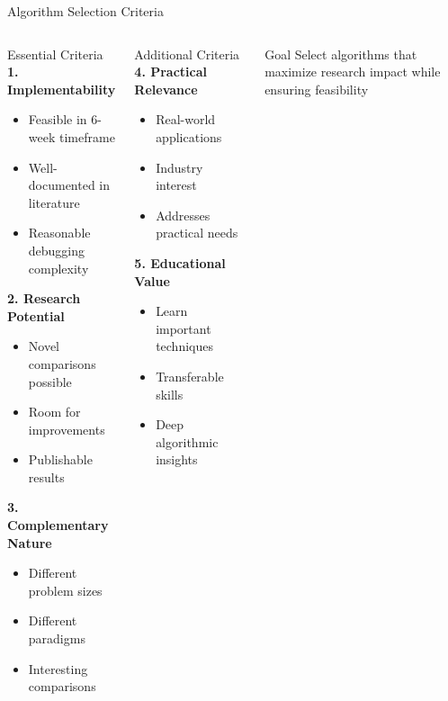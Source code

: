 \documentclass[aspectratio=169]{beamer}
\renewcommand{\footnotesize}{\tiny}
\begin{document}
\begin{frame}{Algorithm Selection Criteria}
	\begin{columns}[T]
		\begin{block}{Essential Criteria}
			\footnotesize
			\textbf{1. Implementability}
			\begin{itemize}
				\item Feasible in 6-week timeframe
				\item Well-documented in literature
				\item Reasonable debugging complexity
			\end{itemize}

			\textbf{2. Research Potential}
			\begin{itemize}
				\item Novel comparisons possible
				\item Room for improvements
				\item Publishable results
			\end{itemize}

			\textbf{3. Complementary Nature}
			\begin{itemize}
				\item Different problem sizes
				\item Different paradigms
				\item Interesting comparisons
			\end{itemize}
		\end{block}

		\begin{block}{Additional Criteria}
			\footnotesize
			\textbf{4. Practical Relevance}
			\begin{itemize}
				\item Real-world applications
				\item Industry interest
				\item Addresses practical needs
			\end{itemize}

			\textbf{5. Educational Value}
			\begin{itemize}
				\item Learn important techniques
				\item Transferable skills
				\item Deep algorithmic insights
			\end{itemize}
		\end{block}

		\begin{alertblock}{Goal}
			\footnotesize
			Select algorithms that maximize research impact while ensuring feasibility
		\end{alertblock}
	\end{columns}
\end{frame}
\end{document}
